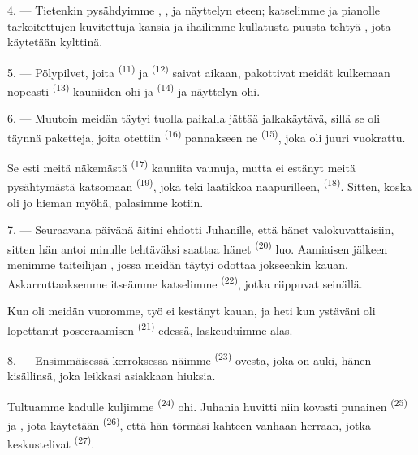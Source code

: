 \VUsaut{3.0mm}

4. --- Tietenkin pysähdyimme , ,
 ja  näyttelyn eteen; katselimme
 ja pianolle tarkoitettujen 
kuvitettuja kansia ja ihailimme kullatusta puusta tehtyä , jota
käytetään kylttinä.

5. --- Pölypilvet, joita  \textsuperscript{(11)} ja
 \textsuperscript{(12)} saivat aikaan, pakottivat meidät
kulkemaan nopeasti  \textsuperscript{(13)}
kauniiden  ohi ja 
\textsuperscript{(14)}  ja  näyttelyn ohi.

6. --- Muutoin meidän täytyi tuolla paikalla jättää jalkakäytävä, sillä se oli
täynnä paketteja, joita otettiin  \textsuperscript{(16)}
pannakseen ne  \textsuperscript{(15)}, joka oli juuri
vuokrattu.

Se esti meitä näkemästä  \textsuperscript{(17)} kauniita
vaunuja, mutta ei estänyt meitä pysähtymästä katsomaan 
\textsuperscript{(19)}, joka teki laatikkoa naapurilleen,
 \textsuperscript{(18)}. Sitten,
koska oli jo hieman myöhä, palasimme kotiin.

\VUsaut{3.0mm}

7. --- Seuraavana päivänä äitini ehdotti Juhanille, että hänet valokuvattaisiin,
sitten hän antoi minulle tehtäväksi saattaa hänet 
\textsuperscript{(20)} luo. Aamiaisen jälkeen menimme taiteilijan
, jossa meidän täytyi odottaa jokseenkin kauan.
Askarruttaaksemme itseämme katselimme 
\textsuperscript{(22)}, jotka riippuvat seinällä.

Kun oli meidän vuoromme, työ ei kestänyt kauan, ja heti kun ystäväni oli
lopettanut poseeraamisen  \textsuperscript{(21)}
edessä, laskeuduimme alas.

8. --- Ensimmäisessä kerroksessa näimme 
\textsuperscript{(23)} ovesta, joka on auki, hänen kisällinsä, joka leikkasi
asiakkaan hiuksia.

Tultuamme kadulle kuljimme  \textsuperscript{(24)} ohi.
Juhania huvitti niin kovasti punainen  \textsuperscript{(25)} ja
, jota käytetään 
\textsuperscript{(26)}, että hän törmäsi kahteen vanhaan herraan, jotka
keskustelivat  \textsuperscript{(27)}.

